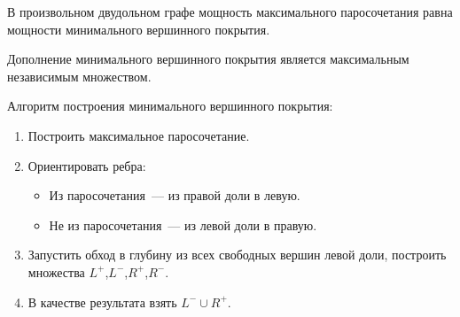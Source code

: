 В произвольном двудольном графе мощность максимального паросочетания равна мощности минимального вершинного покрытия.

Дополнение минимального вершинного покрытия является максимальным независимым множеством.

Алгоритм построения минимального вершинного покрытия:
\begin{enumerate}
\item Построить максимальное паросочетание.
\item Ориентировать ребра:
\begin{itemize}
\item Из паросочетания~--- из правой доли в левую.
\item Не из паросочетания~--- из левой доли в правую.
\end{itemize}
\item Запустить обход в глубину из всех свободных вершин левой доли, построить множества $L^+$,$L^−$,$R^+$,$R^−$.
\item В качестве результата взять $L^− \cup R^+$.
\end{enumerate}
